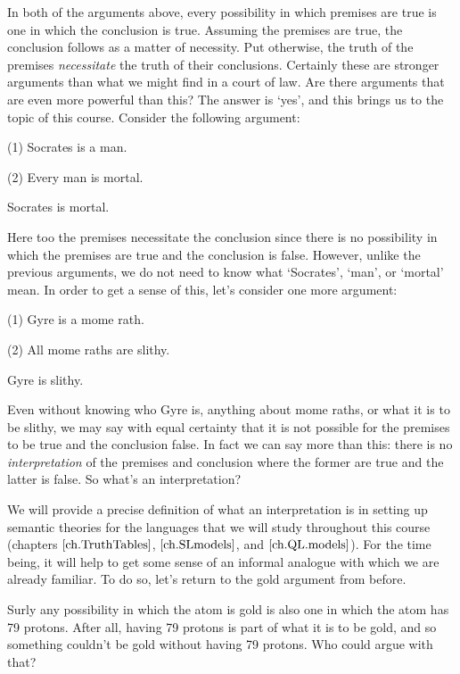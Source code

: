 In both of the arguments above, every possibility in which premises are true is one in which the conclusion is true.
Assuming the premises are true, the conclusion follows as a matter of necessity.
Put otherwise, the truth of the premises \emph{necessitate} the truth of their conclusions.
Certainly these are stronger arguments than what we might find in a court of law.
Are there arguments that are even more powerful than this?
The answer is `yes', and this brings us to the topic of this course.
Consider the following argument:

\begin{earg}
  \item[(1)] Socrates is a man.
  \item[(2)] Every man is mortal.
  \item[\therefore] Socrates is mortal.
\end{earg}

Here too the premises necessitate the conclusion since there is no possibility in which the premises are true and the conclusion is false.
However, unlike the previous arguments, we do not need to know what `Socrates', `man', or `mortal' mean.
In order to get a sense of this, let's consider one more argument:

\begin{earg}
  \item[(1)] Gyre is a mome rath.
  \item[(2)] All mome raths are slithy.
  \item[\therefore] Gyre is slithy.
\end{earg}

Even without knowing who Gyre is, anything about mome raths, or what it is to be slithy, we may say with equal certainty that it is not possible for the premises to be true and the conclusion false.
In fact we can say more than this: there is no \textit{interpretation} of the premises and conclusion where the former are true and the latter is false.
So what's an interpretation?

We will provide a precise definition of what an interpretation is in setting up semantic theories for the languages that we will study throughout this course (chapters $\ref{ch.TruthTables}$, $\ref{ch.SLmodels}$, and $\ref{ch.QL.models}$).
For the time being, it will help to get some sense of an informal analogue with which we are already familiar.
To do so, let's return to the gold argument from before.

Surly any possibility in which the atom is gold is also one in which the atom has 79 protons.
After all, having 79 protons is part of what it is to be gold, and so something couldn't be gold without having 79 protons.
Who could argue with that?


